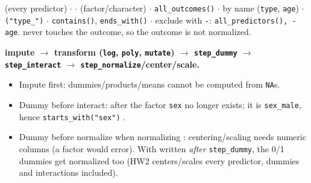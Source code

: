 \begin{keybox}
 (every predictor) $\cdot$  $\cdot$ 
(factor/character) $\cdot$ \texttt{all\_outcomes()} $\cdot$ by name (\texttt{type}, \texttt{age}) $\cdot$ \texttt{("type\_")}
$\cdot$ \texttt{contains()}, \texttt{ends\_with()} $\cdot$ exclude with \texttt{-}: \texttt{all\_predictors(), -age}.
 never touches the outcome, so the outcome is not normalized.
\end{keybox}

\begin{keybox}
\textbf{impute $\to$ transform (\texttt{log}, \texttt{poly}, \texttt{mutate}) $\to$ \texttt{step\_dummy} $\to$
\texttt{step\_interact} $\to$ \texttt{step\_normalize}/center/scale.}
\begin{itemize}
\item Impute first: dummies/products/means cannot be computed from \texttt{NA}s.
\item Dummy before interact: after  the factor \texttt{sex} no longer exists; it is \texttt{sex\_male},
  hence \texttt{starts\_with("sex")} .
\item Dummy before normalize when normalizing : centering/scaling needs numeric columns
  (a factor would error). With  written \emph{after} \texttt{step\_dummy}, the 0/1 dummies get
  normalized too (HW2 centers/scales every predictor, dummies and interactions included).
\end{itemize}
\end{keybox}

